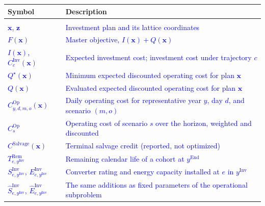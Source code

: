 \documentclass[preprint,12pt]{elsarticle}
\begin{document}
\begingroup
    \footnotesize
    \setlength{\LTpre}{0pt}
    \setlength{\LTpost}{0pt}
    \begin{longtable}{@{}>{\raggedright\arraybackslash}p{} >{\raggedright\arraybackslash}p{}@{}}
        \toprule
        \textbf{Symbol} & \textbf{Description} \\
        \midrule
        \endhead
        \midrule
        \endfoot
        \bottomrule
        \endlastfoot
        \multicolumn{2}{@{}l}{\textbf{Planning}}\\*
        \textcolor{blue}{$\boldsymbol{x}$, $\boldsymbol{z}$} & \textcolor{blue}{Investment plan and its lattice coordinates} \\
        \textcolor{blue}{$F(\boldsymbol{x})$} & \textcolor{blue}{Master objective, $I(\boldsymbol{x}) + Q(\boldsymbol{x})$} \\
        \textcolor{blue}{$I(\boldsymbol{x})$, $C^{\text{Inv}}_c(\boldsymbol{x})$} & \textcolor{blue}{Expected investment cost; investment cost under trajectory $c$} \\
        \textcolor{blue}{$Q^\star(\boldsymbol{x})$} & \textcolor{blue}{Minimum expected discounted operating cost for plan $\boldsymbol{x}$} \\
        \textcolor{blue}{$Q(\boldsymbol{x})$} & \textcolor{blue}{Evaluated expected discounted operating cost for plan $\boldsymbol{x}$} \\
        \textcolor{blue}{$C^{\text{Op}}_{y,d,m,o}(\boldsymbol{x})$} & \textcolor{blue}{Daily operating cost for representative year $y$, day $d$, and scenario $(m,o)$} \\
        \textcolor{blue}{$C^{\text{Op}}_{s}$} & \textcolor{blue}{Operating cost of scenario $s$ over the horizon, weighted and discounted}\\
        \textcolor{blue}{$C^{\text{Salvage}}(\boldsymbol{x})$} & \textcolor{blue}{Terminal salvage credit (reported, not optimized)} \\
        \textcolor{blue}{$T^{\text{Rem}}_{e,y^{\text{Inv}}}$} & \textcolor{blue}{Remaining calendar life of a cohort at $y^{\text{End}}$} \\
        \textcolor{blue}{$S^{\text{Inv}}_{e,y^{\text{Inv}}}$, $E^{\text{Inv}}_{e,y^{\text{Inv}}}$} & \textcolor{blue}{Converter rating and energy capacity installed at $e$ in $y^{\text{Inv}}$} \\
        \textcolor{blue}{$\hat{S}^{\text{Inv}}_{e,y^{\text{Inv}}}$, $\hat{E}^{\text{Inv}}_{e,y^{\text{Inv}}}$} & \textcolor{blue}{The same additions as fixed parameters of the operational subproblem} \\

\end{longtable}
\end{document}
